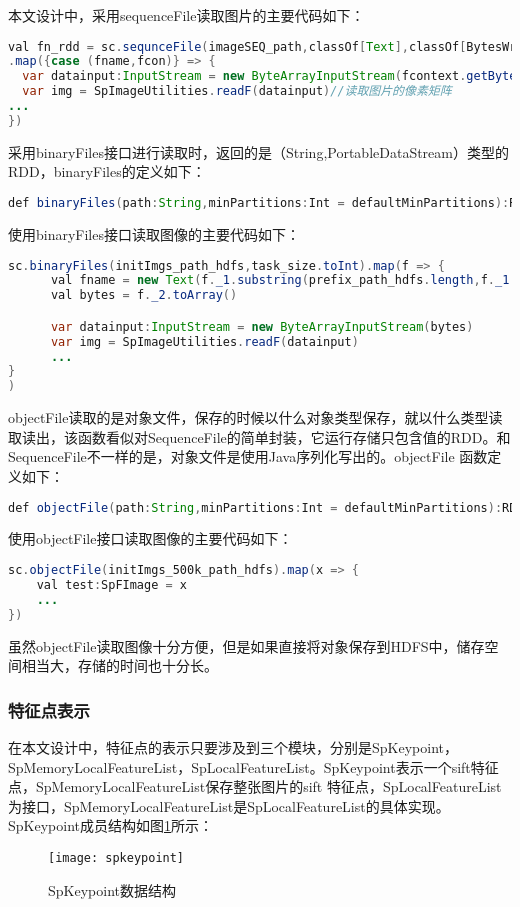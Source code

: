 本文设计中，采用sequenceFile读取图片的主要代码如下：
\begin{lstlisting}[language=Java,numbers=none,frame=none]
val fn_rdd = sc.sequnceFile(imageSEQ_path,classOf[Text],classOf[BytesWritable],task_size.toInt)
.map({case (fname,fcon)} => {
  var datainput:InputStream = new ByteArrayInputStream(fcontext.getBytes)
  var img = SpImageUtilities.readF(datainput)//读取图片的像素矩阵
...
})
\end{lstlisting}
采用binaryFiles接口进行读取时，返回的是（String,PortableDataStream）类型的RDD，binaryFiles的定义如下：
\begin{lstlisting}[language=Java,numbers=none,frame=none]
def binaryFiles(path:String,minPartitions:Int = defaultMinPartitions):RDD[(String,PortableDataStream)]=withScope{}
\end{lstlisting}
使用binaryFiles接口读取图像的主要代码如下：
\begin{lstlisting}[language=Java,numbers=none,frame=none]
 sc.binaryFiles(initImgs_path_hdfs,task_size.toInt).map(f => {
      val fname = new Text(f._1.substring(prefix_path_hdfs.length,f._1.length))//获取features key
      val bytes = f._2.toArray()

      var datainput:InputStream = new ByteArrayInputStream(bytes)
      var img = SpImageUtilities.readF(datainput)
      ...
}
)
\end{lstlisting}
objectFile读取的是对象文件，保存的时候以什么对象类型保存，就以什么类型读取读出，该函数看似对SequenceFile的简单封装，它运行存储只包含值的RDD。和SequenceFile不一样的是，对象文件是使用Java序列化写出的。objectFile 函数定义如下：
\begin{lstlisting}[language=Java,numbers=none,frame=none]
def objectFile(path:String,minPartitions:Int = defaultMinPartitions):RDD[T]=withScope{}
\end{lstlisting}
使用objectFile接口读取图像的主要代码如下：
\begin{lstlisting}[language=Java,numbers=none,frame=none]
sc.objectFile(initImgs_500k_path_hdfs).map(x => {
    val test:SpFImage = x
    ...
})
\end{lstlisting}
虽然objectFile读取图像十分方便，但是如果直接将对象保存到HDFS中，储存空间相当大，存储的时间也十分长。
\subsubsection{特征点表示}
在本文设计中，特征点的表示只要涉及到三个模块，分别是SpKeypoint，SpMemoryLocalFeatureList，SpLocalFeatureList。SpKeypoint表示一个sift特征点，SpMemoryLocalFeatureList保存整张图片的sift 特征点，SpLocalFeatureList为接口，SpMemoryLocalFeatureList是SpLocalFeatureList的具体实现。SpKeypoint成员结构如图\ref{fig:spkeypoint}所示：
\begin{figure}[htp]
\centering
\texttt{[image: spkeypoint]}
\caption{SpKeypoint数据结构}
\label{fig:spkeypoint}
\end{figure}

